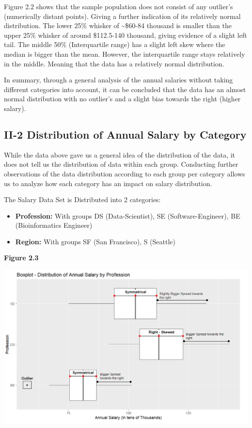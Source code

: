 \documentclass[
]{article}
\begin{document}
Figure 2.2 shows that the sample population does not consist of any
outlier's (numerically distant points). Giving a further indication of
its relatively normal distribution. The lower 25\% whisker of
\textasciitilde\$60-84 thousand is smaller than the upper 25\% whisker
of around \$112.5-140 thousand, giving evidence of a slight left tail.
The middle 50\% (Interquartile range) has a slight left skew where the
median is bigger than the mean. However, the interquartile range stays
relatively in the middle. Meaning that the data has a relatively normal
distribution.

In summary, through a general analysis of the annual salaries without
taking different categories into account, it can be concluded that the
data has an almost normal distribution with no outlier's and a slight
bias towards the right (higher salary).

\subsection{II-2 Distribution of Annual Salary by
Category}\label{ii-2-distribution-of-annual-salary-by-category}

While the data above gave us a general idea of the distribution of the
data, it does not tell us the distribution of data within each group.
Conducting further observations of the data distribution according to
each group per category allows us to analyze how each category has an
impact on salary distribution.

The Salary Data Set is Distributed into 2 categories:

\begin{itemize}
\item
  \textbf{Profession:} With groups DS (Data-Scientist), SE
  (Software-Engineer), BE (Bioinformatics Engineer)
\item
  \textbf{Region:} With groups SF (San Francisco), S (Seattle)
\end{itemize}

\textbf{Figure 2.3}

\includegraphics[width=7.29167in,height=\textheight]{Profession Data Boxplot.png}
\end{document}
